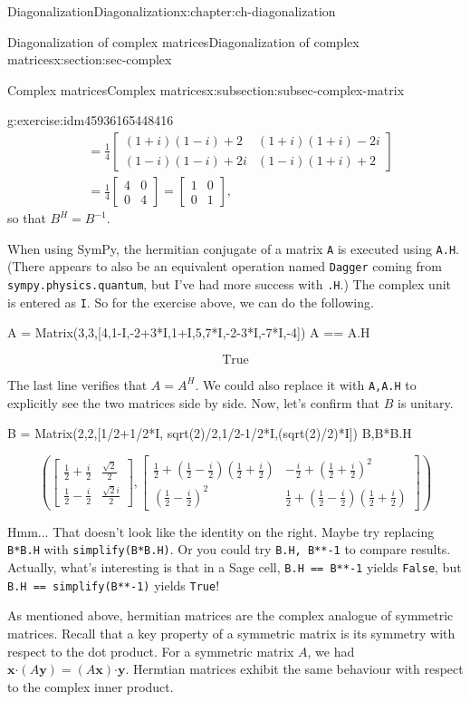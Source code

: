 \documentclass[oneside,10pt,]{book}
\newcommand{\mono}[1]{\texttt{#1}}
\numberwithin{equation}{section}
\newcommand{\bbm}{\begin{bmatrix}}
\newcommand{\ebm}{\end{bmatrix}}
\newcommand{\dotp}{\!\boldsymbol{\cdot}\!}
\newcommand{\amp}{&}
\begin{document}
\begin{chapterptx}{Diagonalization}{}{Diagonalization}{}{}{x:chapter:ch-diagonalization}
\begin{sectionptx}{Diagonalization of complex matrices}{}{Diagonalization of complex matrices}{}{}{x:section:sec-complex}
\begin{subsectionptx}{Complex matrices}{}{Complex matrices}{}{}{x:subsection:subsec-complex-matrix}
\begin{inlineexercise}{}{g:exercise:idm45936165448416}
\begin{align*}
\amp =\frac14\bbm (1+i)(1-i)+2\amp (1+i)(1+i)-2i\\(1-i)(1-i)+2i\amp (1-i)(1+i)+2\ebm\\
\amp =\frac14\bbm 4\amp 0\\0\amp 4\ebm = \bbm 1\amp 0\\0\amp 1\ebm\text{,}
\end{align*}
so that \(B^H = B^{-1}\).%
\end{inlineexercise}%
When using SymPy, the hermitian conjugate of a matrix \mono{A} is executed using \mono{A.H}. (There appears to also be an equivalent operation named \mono{Dagger} coming from \mono{sympy.physics.quantum}, but I've had more success with \mono{.H}.) The complex unit is entered as \mono{I}. So for the exercise above, we can do the following.%
\begin{sageinput}
A = Matrix(3,3,[4,1-I,-2+3*I,1+I,5,7*I,-2-3*I,-7*I,-4])
A == A.H
\end{sageinput}
\begin{sageoutput}
\[\text{True}\]
\end{sageoutput}
The last line verifies that \(A=A^H\). We could also replace it with \mono{A,A.H} to explicitly see the two matrices side by side. Now, let's confirm that \(B\) is unitary.%
\begin{sageinput}
B = Matrix(2,2,[1/2+1/2*I, sqrt(2)/2,1/2-1/2*I,(sqrt(2)/2)*I])
B,B*B.H
\end{sageinput}
\begin{sageoutput}
\[\left(\bbm \frac12+\frac{i}{2}\amp \frac{\sqrt{2}}{2}\\ \frac12-\frac{i}{2}\amp \frac{\sqrt{2}i}{2}\ebm,
 \bbm \frac12 + \left(\frac12-\frac{i}{2}\right)\left(\frac12+\frac{i}{2}\right)\amp
-\frac{i}{2}+\left(\frac12+\frac{i}{2}\right)^2\\ \left(\frac12-\frac{i}{2}\right)^2\amp
\frac12 + \left(\frac12-\frac{i}{2}\right)\left(\frac12+\frac{i}{2}\right)\ebm\right)\]
\end{sageoutput}
Hmm... That doesn't look like the identity on the right. Maybe try replacing \mono{B*B.H} with \mono{simplify(B*B.H)}. Or you could try \mono{B.H, B**-1} to compare results. Actually, what's interesting is that in a Sage cell, \mono{B.H == B**-1} yields \mono{False}, but \mono{B.H == simplify(B**-1)} yields \mono{True}!%
\par
As mentioned above, hermitian matrices are the complex analogue of symmetric matrices. Recall that a key property of a symmetric matrix is its symmetry with respect to the dot product. For a symmetric matrix \(A\), we had \(\mathbf{x}\dotp (A\mathbf{y})=(A\mathbf{x})\dotp \mathbf{y}\). Hermtian matrices exhibit the same behaviour with respect to the complex inner product.%

\end{subsectionptx}
\end{sectionptx}
\end{chapterptx}
\end{document}
